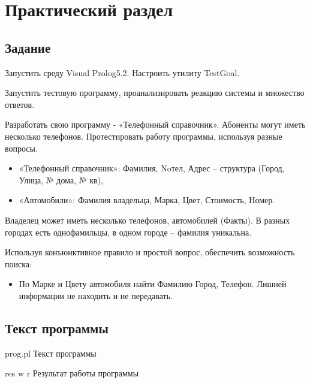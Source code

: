 \chapter{Практический раздел}

\section{Задание}

Запустить среду Visual Prolog5.2. Настроить утилиту TestGoal.

Запустить тестовую программу, проанализировать реакцию системы и множество ответов.

Разработать свою программу - «Телефонный справочник». Абоненты могут иметь несколько телефонов. Протестировать работу программы, используя разные вопросы.

\begin{itemize}
    \item «Телефонный справочник»: Фамилия, Noтел, Адрес – структура (Город, Улица, № дома, № кв),
    \item «Автомобили»: Фамилия владельца, Марка, Цвет, Стоимость, Номер.
\end{itemize}

Владелец может иметь несколько телефонов, автомобилей (Факты). В разных городах есть однофамильцы, в одном городе – фамилия уникальна.

Используя конъюнктивное правило и простой вопрос, обеспечить возможность поиска:

\begin{itemize}
    \item По Марке и Цвету автомобиля найти Фамилию Город, Телефон. Лишней информации не находить и не передавать.
\end{itemize}

\section{Текст программы}

    {prog.pl}
    {Текст программы}

    {res}
    {w}
    {r}
    {\linewidth}
    {Результат работы программы}

